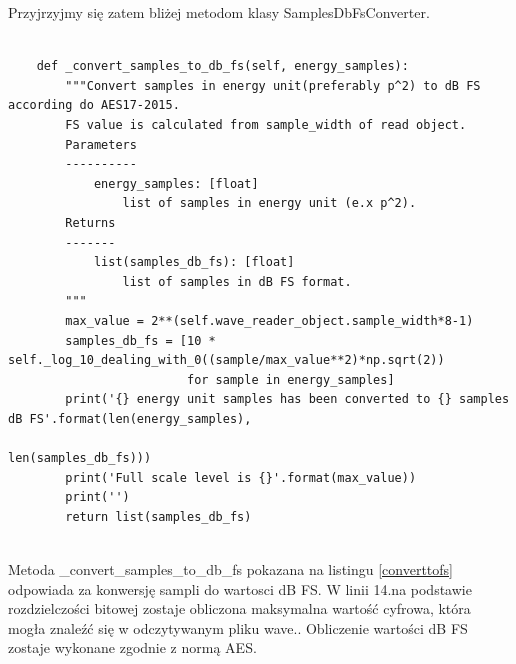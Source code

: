 \documentclass[eng,printmode]{mgr}
\begin{document}
Przyjrzyjmy się zatem bliżej metodom klasy SamplesDbFsConverter.

\begin{minipage}{\linewidth}
\begin{lstlisting}[caption={fragment kodu źródłowego pliku SampledBConverter.py, klasa SamplesDbSPLConverter, metoda \_convert\_samples\_to\_db\_fs},captionpos=b,label={converttofs}]

    def _convert_samples_to_db_fs(self, energy_samples):
        """Convert samples in energy unit(preferably p^2) to dB FS according do AES17-2015.
        FS value is calculated from sample_width of read object.
        Parameters
        ----------
            energy_samples: [float]
                list of samples in energy unit (e.x p^2).
        Returns
        -------
            list(samples_db_fs): [float]
                list of samples in dB FS format.
        """
        max_value = 2**(self.wave_reader_object.sample_width*8-1)
        samples_db_fs = [10 * self._log_10_dealing_with_0((sample/max_value**2)*np.sqrt(2))
                         for sample in energy_samples]
        print('{} energy unit samples has been converted to {} samples dB FS'.format(len(energy_samples),
                                                                                     len(samples_db_fs)))
        print('Full scale level is {}'.format(max_value))
        print('')
        return list(samples_db_fs)
    
\end{lstlisting}
\end{minipage}

Metoda \_convert\_samples\_to\_db\_fs pokazana na listingu \ref{converttofs} odpowiada za konwersję sampli do wartosci dB FS. W linii 14.na podstawie rozdzielczości bitowej zostaje obliczona maksymalna wartość cyfrowa, która mogła znaleźć się w odczytywanym pliku wave.\cite{Cyfrowe_przetwarzanie_sygnalow}. Obliczenie wartości dB FS zostaje wykonane zgodnie z normą AES\cite{AES17}.
\end{document}
